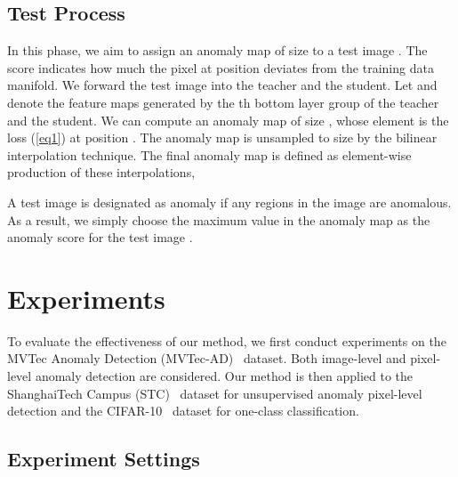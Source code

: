 \documentclass[final]{cvpr}
\begin{document}
{\subsection{Test Process}
\label{sec3-sub2}

In this phase, we aim to assign an anomaly map  of size  to a test image . The score  indicates how much the pixel at position  deviates from the training data manifold. We forward the test image  into the teacher and the student. Let  and  denote the feature maps generated by the th bottom layer group of the teacher and the student. We can compute an anomaly map  of size , whose element  is the loss (\ref{eq1}) at position . The anomaly map  is unsampled to size  by the bilinear interpolation technique. The final anomaly map is defined as element-wise production of these interpolations,

A test image is designated as anomaly if any regions in the image are anomalous. As a result, we simply choose the maximum value in the anomaly map  as the anomaly score for the test image .

\section{Experiments}
\label{sec4}

To evaluate the effectiveness of our method, we first conduct experiments on the MVTec Anomaly Detection (MVTec-AD)~\cite{Bergmann2019} dataset. Both image-level and pixel-level anomaly detection are considered. Our method is then applied to the ShanghaiTech Campus (STC)~\cite{Liu2018} dataset for unsupervised anomaly pixel-level detection and the CIFAR-10~\cite{Krizhevsky2009} dataset for one-class classification.

\subsection{Experiment Settings}


}
\end{document}
